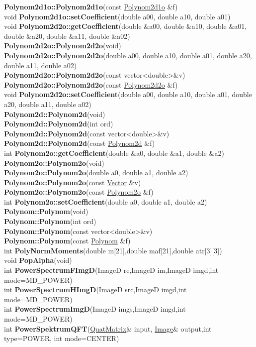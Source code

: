 \documentclass[10pt,titlepage]{article}
\def\functionlistentry#1#2#3#4#5#6{\noindent #1 {\bf #2}(#3) \dotfill #6\\}
\begin{document}
{{\functionlistentry{}{Polynom2d1o::Polynom2d1o}{const \hyperlink{Polynom2d1o}{Polynom2d1o} \&f}{1041}{functions}{}
\functionlistentry{void}{Polynom2d1o::setCoefficient}{double a00, double a10, double a01}{1042}{functions}{}
\functionlistentry{void}{Polynom2d2o::getCoefficient}{double \&a00, double \&a10, double \&a01, double \&a20, double \&a11, double \&a02}{1049}{functions}{}
\functionlistentry{}{Polynom2d2o::Polynom2d2o}{void}{1044}{functions}{}
\functionlistentry{}{Polynom2d2o::Polynom2d2o}{double a00, double a10, double a01, double a20, double a11, double a02}{1045}{functions}{}
\functionlistentry{}{Polynom2d2o::Polynom2d2o}{const vector\textless {}double\textgreater  \&v}{1046}{functions}{}
\functionlistentry{}{Polynom2d2o::Polynom2d2o}{const \hyperlink{Polynom2d2o}{Polynom2d2o} \&f}{1047}{functions}{}
\functionlistentry{void}{Polynom2d2o::setCoefficient}{double a00, double a10, double a01, double a20, double a11, double a02}{1048}{functions}{}
\functionlistentry{}{Polynom2d::Polynom2d}{void}{1050}{functions}{}
\functionlistentry{}{Polynom2d::Polynom2d}{int ord}{1051}{functions}{}
\functionlistentry{}{Polynom2d::Polynom2d}{const vector\textless {}double\textgreater  \&v}{1052}{functions}{}
\functionlistentry{}{Polynom2d::Polynom2d}{const \hyperlink{Polynom2d}{Polynom2d} \&f}{1053}{functions}{}
\functionlistentry{int}{Polynom2o::getCoefficient}{double \&a0, double \&a1, double \&a2}{1014}{functions}{}
\functionlistentry{}{Polynom2o::Polynom2o}{void}{1009}{functions}{}
\functionlistentry{}{Polynom2o::Polynom2o}{double a0, double a1, double a2}{1010}{functions}{}
\functionlistentry{}{Polynom2o::Polynom2o}{const \hyperlink{Vector}{Vector} \&v}{1011}{functions}{}
\functionlistentry{}{Polynom2o::Polynom2o}{const \hyperlink{Polynom2o}{Polynom2o} \&f}{1012}{functions}{}
\functionlistentry{int}{Polynom2o::setCoefficient}{double a0, double a1, double a2}{1013}{functions}{}
\functionlistentry{}{Polynom::Polynom}{void}{1015}{functions}{}
\functionlistentry{}{Polynom::Polynom}{int ord}{1016}{functions}{}
\functionlistentry{}{Polynom::Polynom}{const vector\textless {}double\textgreater  \&v}{1017}{functions}{}
\functionlistentry{}{Polynom::Polynom}{const \hyperlink{Polynom}{Polynom} \&f}{1018}{functions}{}
\functionlistentry{int}{PolyNormMoments}{double m[21],double maf[21],double atr[3][3]}{1618}{obsolet}{}
\functionlistentry{void}{PopAlpha}{void}{1420}{genericTools}{}
\functionlistentry{int}{PowerSpectrumFImgD}{ImageD re,ImageD im,ImageD imgd,int mode=MD\_POWER}{1202}{signalTrafo}{}
\functionlistentry{int}{PowerSpectrumHImgD}{ImageD src,ImageD imgd,int mode=MD\_POWER}{1203}{signalTrafo}{}
\functionlistentry{int}{PowerSpectrumImgD}{ImageD imgs,ImageD imgd,int mode=MD\_POWER}{1204}{signalTrafo}{}
\functionlistentry{int}{PowerSpektrumQFT}{\hyperlink{QuatMatrix}{QuatMatrix}\& input, \hyperlink{Image}{Image}\& output,int type=POWER, int mode=CENTER}{1541}{quaternions}{}

}}
\end{document}
